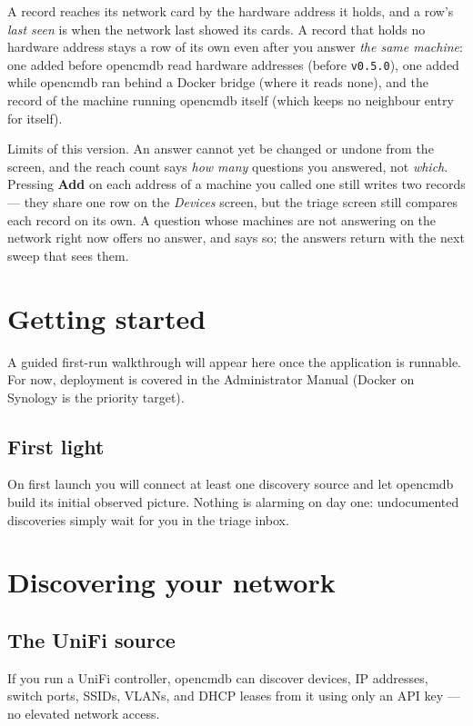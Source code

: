 \documentclass[11pt,oneside,listof=totoc,bibliography=totoc]{scrreprt}
\begin{document}
A record reaches its network card by the hardware address it holds, and a row's \emph{last seen}
is when the network last showed its cards. A record that holds no hardware address stays a row of its
own even after you answer \emph{the same machine}: one added before opencmdb read hardware addresses
(before \texttt{v0.5.0}), one added while opencmdb ran behind a Docker bridge (where it reads none),
and the record of the machine running opencmdb itself (which keeps no neighbour entry for itself).

\begin{planned}
Limits of this version. An answer cannot yet be changed or undone from the screen, and the reach
count says \emph{how many} questions you answered, not \emph{which}. Pressing \textbf{Add} on each
address of a machine you called one still writes two records --- they share one row on the
\emph{Devices} screen, but the triage screen still compares each record on its own. A question whose
machines are not answering on the network right now offers no answer, and says so; the answers
return with the next sweep that sees them.
\end{planned}

\chapter{Getting started}
\begin{planned}
A guided first-run walkthrough will appear here once the application is runnable. For now,
deployment is covered in the Administrator Manual (Docker on Synology is the priority
target).
\end{planned}

\section{First light}
On first launch you will connect at least one discovery source and let opencmdb build its
initial observed picture. Nothing is alarming on day one: undocumented discoveries simply
wait for you in the triage inbox.

\chapter{Discovering your network}
\section{The UniFi source}
If you run a UniFi controller, opencmdb can discover devices, IP addresses, switch ports,
SSIDs, VLANs, and DHCP leases from it using only an API key — no elevated network access.
\end{document}
